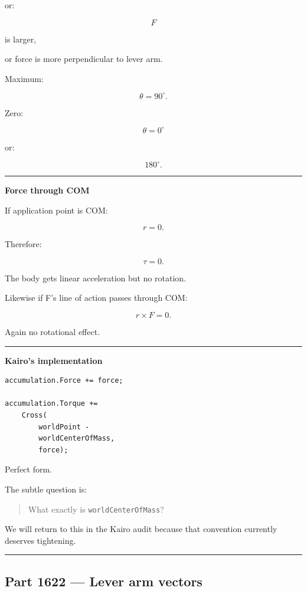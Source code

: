 or:

\[
F
\]

is larger,

or force is more perpendicular to lever arm.

Maximum:

\[
\theta=90^\circ.
\]

Zero:

\[
\theta=0^\circ
\]

or:

\[
180^\circ.
\]

\begin{center}\rule{0.5\linewidth}{0.5pt}\end{center}

\textbf{Force through COM}

If application point is COM:

\[
r=0.
\]

Therefore:

\[
\tau=0.
\]

The body gets linear acceleration but no rotation.

Likewise if F's line of action passes through COM:

\[
r\times F=0.
\]

Again no rotational effect.

\begin{center}\rule{0.5\linewidth}{0.5pt}\end{center}

\textbf{Kairo's implementation}

\begin{verbatim}
accumulation.Force += force;

accumulation.Torque +=
    Cross(
        worldPoint -
        worldCenterOfMass,
        force);
\end{verbatim}

Perfect form.

The subtle question is:

\begin{quote}
What exactly is \texttt{worldCenterOfMass}?
\end{quote}

We will return to this in the Kairo audit because that convention currently deserves tightening.

\begin{center}\rule{0.5\linewidth}{0.5pt}\end{center}

\subsection{Part 1622 --- Lever arm vectors}\label{06-engine-ii-ch035-part-1622-lever-arm-vectors}

